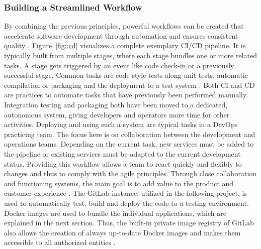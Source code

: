 \documentclass[12pt, a4paper]{article}
\begin{document}
        \subsubsection{Building a Streamlined Workflow}
        By combining the previous principles, powerful workflows can be created that accelerate software development through automation and ensures consistent quality \cite{base_devops}. Figure~\ref{fig::cd} visualizes a complete exemplary \ac{CI}/\ac{CD} pipeline. It is typically built from multiple stages, where each stage bundles one or more related tasks. A stage gets triggered by an event like code check-in or a previously successful stage. Common tasks are code style tests along unit tests, automatic compilation or packaging and the deployment to a test system \cite{azuredevops}.\newline
        Both \ac{CI} and \ac{CD} are practices to automate tasks that have previously been performed manually. Integration testing and packaging both have been moved to a dedicated, autonomous system, giving developers and operators more time for other activities. Deploying and using such a system are typical tasks in a DevOps practicing team. The focus here is on collaboration between the development and operations teams. Depending on the current task, new services must be added to the pipeline or existing services must be adapted to the current development status. Providing this workflow allows a team to react quickly and flexibly to changes and thus to comply with the agile principles. Through close collaboration and functioning systems, the main goal is to add value to the product and customer experience \cite{azuredevops}.\newline
        The GitLab instance, utilized in the following project, is used to automatically test, build and deploy the code to a testing environment. Docker images are used to bundle the individual applications, which are explained in the next section. Thus, the built-in private image registry of GitLab also allows the creation of always up-to-date Docker images and makes them accessible to all authorized entities \cite{gitlabdocs}.
        
\end{document}
